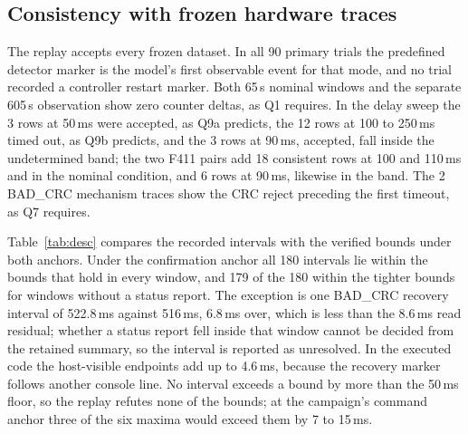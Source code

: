 \documentclass[conference,a4paper]{IEEEtran}
\newif\ifrerunmarks
\DeclareRobustCommand{\rerun}[1]{\ifrerunmarks\textcolor{red}{#1}\else#1\fi}
\begin{document}
\subsection{Consistency with frozen hardware traces}
\label{sec:conf}
The replay accepts every frozen dataset. In all 90 primary trials the predefined detector marker is the model's first observable event for that mode, and no trial recorded a controller restart marker. Both 65\,s nominal windows and the separate 605\,s observation show zero counter deltas, as Q1 requires. In the delay sweep the 3 rows at 50\,ms were accepted, as Q9a predicts, the 12 rows at 100 to 250\,ms timed out, as Q9b predicts, and \rerun{the 3 rows at 90\,ms, accepted, fall inside the undetermined band}; the two F411 pairs add 18 consistent rows at 100 and 110\,ms and in the nominal condition, and \rerun{6 rows at 90\,ms, likewise in the band}. The 2 BAD\_CRC mechanism traces show the CRC reject preceding the first timeout, as Q7 requires.

\rerun{Table~\ref{tab:desc} compares the recorded intervals with the verified bounds under both anchors. Under the confirmation anchor all 180 intervals lie within the bounds that hold in every window, and 179 of the 180 within the tighter bounds for windows without a status report. The exception is one BAD\_CRC recovery interval of 522.8\,ms against 516\,ms, 6.8\,ms over, which is less than the 8.6\,ms read residual; whether a status report fell inside that window cannot be decided from the retained summary, so the interval is reported as unresolved. In the executed code the host-visible endpoints add up to 4.6\,ms, because the recovery marker follows another console line. No interval exceeds a bound by more than the 50\,ms floor, so the replay refutes none of the bounds; at the campaign's command anchor three of the six maxima would exceed them by 7 to 15\,ms.}
\end{document}
